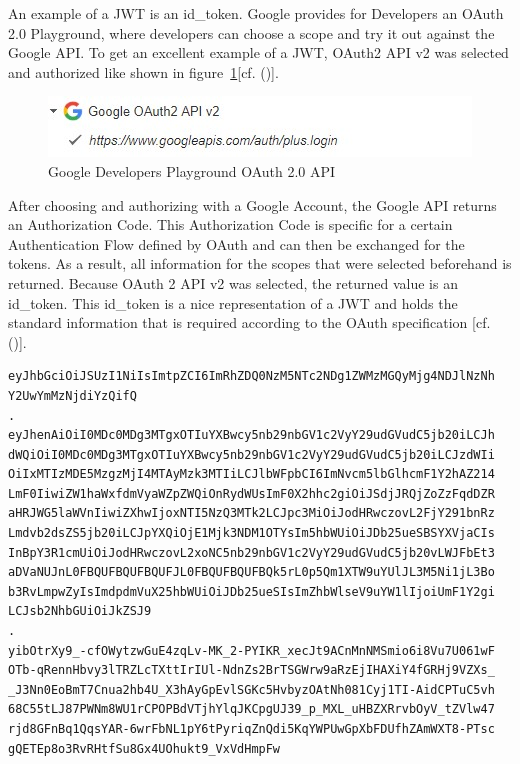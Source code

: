 An example of a JWT is an id\_token. Google provides for Developers an OAuth 2.0 Playground, where developers can choose a scope and try it out against the Google API. To get an excellent example of a JWT, OAuth2 API v2 was selected and authorized like shown in figure~\ref{fig:googleoauthplaygroundoauthapi}[cf. (\cite{Google:2018:OAuthPlayground})].


\begin{figure}[h]
	\centering
	\includegraphics[width=0.8\linewidth]{images/googleOAuthPlaygroundOAuthAPI}
	\caption[OAuth API]{Google Developers Playground OAuth 2.0 API}
	\label{fig:googleoauthplaygroundoauthapi}
\end{figure}

After choosing and authorizing with a Google Account, the Google API returns an Authorization Code. This Authorization Code is specific for a certain Authentication Flow defined by OAuth and can then be exchanged for the tokens. As a result, all information for the scopes that were selected beforehand is returned. Because OAuth 2 API v2 was selected, the returned value is an id\_token. This id\_token is a nice representation of a JWT and holds the standard information that is required according to the OAuth specification  [cf. (\cite{Google:2018:OAuthPlayground})].

\begin{lstlisting}
eyJhbGciOiJSUzI1NiIsImtpZCI6ImRhZDQ0NzM5NTc2NDg1ZWMzMGQyMjg4NDJlNzNh
Y2UwYmMzNjdiYzQifQ
.
eyJhenAiOiI0MDc0MDg3MTgxOTIuYXBwcy5nb29nbGV1c2VyY29udGVudC5jb20iLCJh
dWQiOiI0MDc0MDg3MTgxOTIuYXBwcy5nb29nbGV1c2VyY29udGVudC5jb20iLCJzdWIi
OiIxMTIzMDE5MzgzMjI4MTAyMzk3MTIiLCJlbWFpbCI6ImNvcm5lbGlhcmF1Y2hAZ214
LmF0IiwiZW1haWxfdmVyaWZpZWQiOnRydWUsImF0X2hhc2giOiJSdjJRQjZoZzFqdDZR
aHRJWG5laWVnIiwiZXhwIjoxNTI5NzQ3MTk2LCJpc3MiOiJodHRwczovL2FjY291bnRz
Lmdvb2dsZS5jb20iLCJpYXQiOjE1Mjk3NDM1OTYsIm5hbWUiOiJDb25ueSBSYXVjaCIs
InBpY3R1cmUiOiJodHRwczovL2xoNC5nb29nbGV1c2VyY29udGVudC5jb20vLWJFbEt3
aDVaNUJnL0FBQUFBQUFBQUFJL0FBQUFBQUFBQk5rL0p5Qm1XTW9uYUlJL3M5Ni1jL3Bo
b3RvLmpwZyIsImdpdmVuX25hbWUiOiJDb25ueSIsImZhbWlseV9uYW1lIjoiUmF1Y2gi
LCJsb2NhbGUiOiJkZSJ9
.
yibOtrXy9_-cfOWytzwGuE4zqLv-MK_2-PYIKR_xecJt9ACnMnNMSmio6i8Vu7U061wF
OTb-qRennHbvy3lTRZLcTXttIrIUl-NdnZs2BrTSGWrw9aRzEjIHAXiY4fGRHj9VZXs_
_J3Nn0EoBmT7Cnua2hb4U_X3hAyGpEvlSGKc5HvbyzOAtNh081Cyj1TI-AidCPTuC5vh
68C55tLJ87PWNm8WU1rCPOPBdVTjhYlqJKCpgUJ39_p_MXL_uHBZXRrvbOyV_tZVlw47
rjd8GFnBq1QqsYAR-6wrFbNL1pY6tPyriqZnQdi5KqYWPUwGpXbFDUfhZAmWXT8-PTsc
gQETEp8o3RvRHtfSu8Gx4UOhukt9_VxVdHmpFw
\end{lstlisting}

